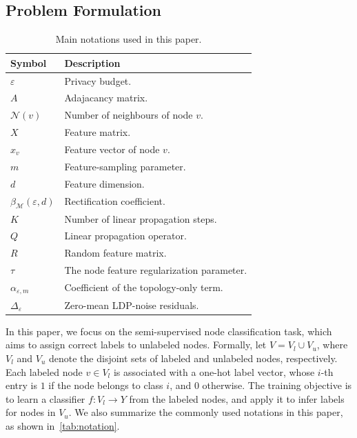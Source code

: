 \documentclass[conference,compsoc]{IEEEtran}
\theoremstyle{boldplain}
\theoremstyle{bolddefinition}
\theoremstyle{remark}
\begin{document}
\subsection{Problem Formulation}
\label{subsec:problem_formulation}



\begin{table}[!t]
    \centering
    \caption{Main notations used in this paper.}
    \label{tab:notation}
    \footnotesize 
    \renewcommand{\arraystretch}{1.1}
    \setlength{\tabcolsep}{3pt} 
    \begin{tabular}{@{} p{} p{} @{}}
        \toprule
        \textbf{Symbol} & \textbf{Description} \\
        \midrule
        $\varepsilon$ & Privacy budget. \\
        $A$ & Adajacancy matrix. \\
        $\mathcal N(v)$ & Number of neighbours of node $v$. \\
        $X$ & Feature matrix. \\
        $x_v$ & Feature vector of node $v$. \\
        $m$ & Feature-sampling parameter. \\
        $d$ & Feature dimension.\\
        $\beta_{\mathcal M}(\varepsilon,d)$ & Rectification coefficient. \\
        $K$ & Number of linear propagation steps. \\
        $Q$ & Linear propagation operator. \\
        $R$ & Random feature matrix. \\
        $\tau$ & The node feature regularization parameter.\\   
        $\alpha_{\varepsilon,m}$ & Coefficient of the topology-only term. \\
        $\Delta_{\varepsilon}$& Zero-mean LDP-noise residuals. \\
        \bottomrule
    \end{tabular}
\end{table}


In this paper, we focus on the semi-supervised node classification task, which aims to assign correct labels to unlabeled nodes.
Formally, let $V = V_l \cup V_u$, where $V_l$ and $V_u$ denote the disjoint sets of labeled and unlabeled nodes, respectively. 
Each labeled node $v \in V_l$ is associated with a one-hot label vector, whose $i$-th entry is $1$ if the node belongs to class $i$, and $0$ otherwise. 
The training objective is to learn a classifier $f: V_l \rightarrow Y$ from the labeled nodes, and apply it to infer labels for nodes in $V_u$.
We also summarize the commonly used notations in this paper, as shown in~\autoref{tab:notation}.
\end{document}
